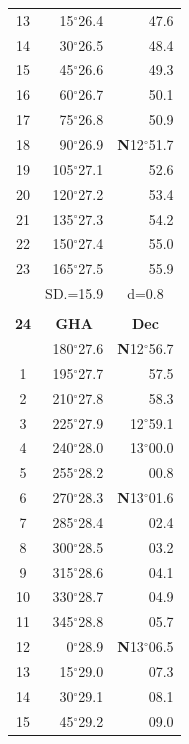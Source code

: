 \documentclass[10pt, a4paper]{report}
\begin{document}
\begin{scriptsize}
\begin{tabular*}{0.2\textwidth}[t]{@{\extracolsep{\fill}}|c|rr|}
13 & 15$^\circ$26.4 & 47.6\\
14 & 30$^\circ$26.5 & 48.4\\
15 & 45$^\circ$26.6 & \raisebox{0.24ex}{\boldmath$\cdot$~\boldmath$\cdot$~~}49.3\\
16 & 60$^\circ$26.7 & 50.1\\
17 & 75$^\circ$26.8 & 50.9\\[2Pt]
18 & 90$^\circ$26.9 & \textbf{N}12$^\circ$51.7\\
19 & 105$^\circ$27.1 & 52.6\\
20 & 120$^\circ$27.2 & 53.4\\
21 & 135$^\circ$27.3 & \raisebox{0.24ex}{\boldmath$\cdot$~\boldmath$\cdot$~~}54.2\\
22 & 150$^\circ$27.4 & 55.0\\
23 & 165$^\circ$27.5 & 55.9\\
\hline
\rule{0pt}{2.4ex} & \multicolumn{1}{c}{SD.=15.9} & \multicolumn{1}{c|}{d=0.8}\\
\hline
\multicolumn{1}{c}{}\\[-0.5ex]\hline
\multicolumn{1}{|c|}{\rule{0pt}{2.6ex}\textbf{24}} & \multicolumn{1}{c}{\textbf{GHA}} & \multicolumn{1}{c|}{\textbf{Dec}}\\
\hline\rule{0pt}{2.6ex}\noindent
0 & 180$^\circ$27.6 & \textbf{N}12$^\circ$56.7\\
1 & 195$^\circ$27.7 & 57.5\\
2 & 210$^\circ$27.8 & 58.3\\
3 & 225$^\circ$27.9 & 12$^\circ$59.1\\
4 & 240$^\circ$28.0 & 13$^\circ$00.0\\
5 & 255$^\circ$28.2 & 00.8\\[2Pt]
6 & 270$^\circ$28.3 & \textbf{N}13$^\circ$01.6\\
7 & 285$^\circ$28.4 & 02.4\\
8 & 300$^\circ$28.5 & 03.2\\
9 & 315$^\circ$28.6 & \raisebox{0.24ex}{\boldmath$\cdot$~\boldmath$\cdot$~~}04.1\\
10 & 330$^\circ$28.7 & 04.9\\
11 & 345$^\circ$28.8 & 05.7\\[2Pt]
12 & 0$^\circ$28.9 & \textbf{N}13$^\circ$06.5\\
13 & 15$^\circ$29.0 & 07.3\\
14 & 30$^\circ$29.1 & 08.1\\
15 & 45$^\circ$29.2 & \raisebox{0.24ex}{\boldmath$\cdot$~\boldmath$\cdot$~~}09.0\\

\end{tabular*}
\end{scriptsize}
\end{document}
